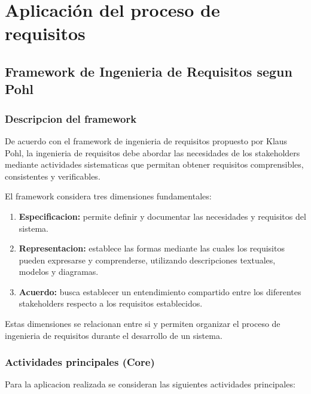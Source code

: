 \documentclass[12pt,a4paper]{article}
\begin{document}
\section{Aplicación del proceso de requisitos}

\subsection{Framework de Ingenieria de Requisitos segun Pohl}

\subsubsection{Descripcion del framework}

De acuerdo con el framework de ingenieria de
requisitos propuesto por Klaus Pohl, la ingenieria
de requisitos debe abordar las necesidades de los
stakeholders mediante actividades sistematicas
que permitan obtener requisitos comprensibles,
consistentes y verificables.

El framework considera tres dimensiones
fundamentales:

\begin{enumerate}
    \item \textbf{Especificacion:} permite definir
    y documentar las necesidades y requisitos
    del sistema.

    \item \textbf{Representacion:} establece las
    formas mediante las cuales los requisitos
    pueden expresarse y comprenderse, utilizando
    descripciones textuales, modelos y diagramas.

    \item \textbf{Acuerdo:} busca establecer un
    entendimiento compartido entre los diferentes
    stakeholders respecto a los requisitos
    establecidos.
\end{enumerate}

Estas dimensiones se relacionan entre si y permiten
organizar el proceso de ingenieria de requisitos
durante el desarrollo de un sistema.

\subsubsection{Actividades principales (Core)}

Para la aplicacion realizada se consideran las
siguientes actividades principales:
\end{document}
